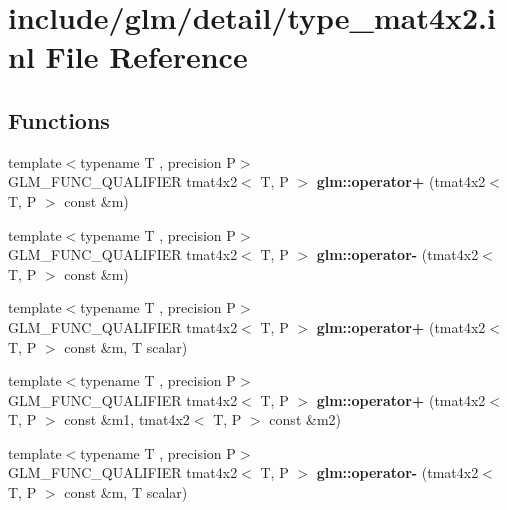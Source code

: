 \hypertarget{type__mat4x2_8inl}{}\section{include/glm/detail/type\+\_\+mat4x2.inl File Reference}
\label{type__mat4x2_8inl}
\subsection*{Functions}
\begin{DoxyCompactItemize}
\item 
\mbox{\label{type__mat4x2_8inl_a38915d7cca65c9dd9a221de7c0b6cae2}} 
{\footnotesize template$<$typename T , precision P$>$ }\\G\+L\+M\+\_\+\+F\+U\+N\+C\+\_\+\+Q\+U\+A\+L\+I\+F\+I\+ER tmat4x2$<$ T, P $>$ {\bfseries glm\+::operator+} (tmat4x2$<$ T, P $>$ const \&m)
\item 
\mbox{\label{type__mat4x2_8inl_ae1976eca7a3d1d7932449c25b1de40eb}} 
{\footnotesize template$<$typename T , precision P$>$ }\\G\+L\+M\+\_\+\+F\+U\+N\+C\+\_\+\+Q\+U\+A\+L\+I\+F\+I\+ER tmat4x2$<$ T, P $>$ {\bfseries glm\+::operator-\/} (tmat4x2$<$ T, P $>$ const \&m)
\item 
\mbox{\label{type__mat4x2_8inl_a57a8bf68dc86bb3a9e84284ada45a272}} 
{\footnotesize template$<$typename T , precision P$>$ }\\G\+L\+M\+\_\+\+F\+U\+N\+C\+\_\+\+Q\+U\+A\+L\+I\+F\+I\+ER tmat4x2$<$ T, P $>$ {\bfseries glm\+::operator+} (tmat4x2$<$ T, P $>$ const \&m, T scalar)
\item 
\mbox{\label{type__mat4x2_8inl_a6b61c12b4e0452bcbce315424bc3d58a}} 
{\footnotesize template$<$typename T , precision P$>$ }\\G\+L\+M\+\_\+\+F\+U\+N\+C\+\_\+\+Q\+U\+A\+L\+I\+F\+I\+ER tmat4x2$<$ T, P $>$ {\bfseries glm\+::operator+} (tmat4x2$<$ T, P $>$ const \&m1, tmat4x2$<$ T, P $>$ const \&m2)
\item 
\mbox{\label{type__mat4x2_8inl_aa62b1abe3764c89c7bffbad684c7c924}} 
{\footnotesize template$<$typename T , precision P$>$ }\\G\+L\+M\+\_\+\+F\+U\+N\+C\+\_\+\+Q\+U\+A\+L\+I\+F\+I\+ER tmat4x2$<$ T, P $>$ {\bfseries glm\+::operator-\/} (tmat4x2$<$ T, P $>$ const \&m, T scalar)

\end{DoxyCompactItemize}
